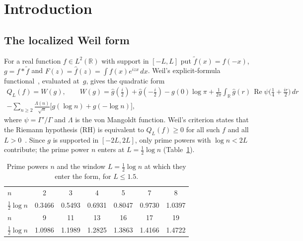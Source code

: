 \documentclass[11pt]{amsart}
\newcommand{\R}{\mathbb{R}}
\newcommand{\re}{\operatorname{Re}}
\theoremstyle{definition}
\theoremstyle{remark}
\numberwithin{equation}{section}
\begin{document}
\section{Introduction}\label{sec:intro}

\subsection{The localized Weil form}
For a real function $f\in L^2(\R)$ with support in $[-L,L]$ put $\tilde f(x)=f(-x)$, $g=f*\tilde f$ and $F(z)=\hat f(z)=\int f(x)e^{izx}\,dx$. Weil's explicit-formula functional~\cite{Weil}, evaluated at~$g$, gives the quadratic form
\begin{multline}\label{eq:weil}
Q_L(f)=W(g),\qquad
W(g)=\hat g(\tfrac i2)+\hat g(-\tfrac i2)-g(0)\log\pi+\frac1{2\pi}\int_\R\hat g(r)\,\re\psi\bigl(\tfrac14+\tfrac{ir}{2}\bigr)\,dr\\
-\sum_{n\ge2}\frac{\Lambda(n)}{\sqrt n}\bigl[g(\log n)+g(-\log n)\bigr],
\end{multline}
where $\psi=\Gamma'/\Gamma$ and $\Lambda$ is the von Mangoldt function. Weil's criterion states that the Riemann hypothesis (RH) is equivalent to $Q_L(f)\ge0$ for all such $f$ and all $L>0$~\cite{Weil,Bombieri}. Since $g$ is supported in $[-2L,2L]$, only prime powers with $\log n<2L$ contribute; the prime power $n$ enters at $L=\tfrac12\log n$ (Table~\ref{tab:primes}).

\begin{table}[ht]
\centering\small
\caption{Prime powers $n$ and the window $L=\tfrac12\log n$ at which they enter the form, for $L\le1.5$.}\label{tab:primes}
\begin{tabular}{l*{6}{c}}
\toprule
$n$ & 2 & 3 & 4 & 5 & 7 & 8\\
$\tfrac12\log n$ & 0.3466 & 0.5493 & 0.6931 & 0.8047 & 0.9730 & 1.0397\\
\midrule
$n$ & 9 & 11 & 13 & 16 & 17 & 19\\
$\tfrac12\log n$ & 1.0986 & 1.1989 & 1.2825 & 1.3863 & 1.4166 & 1.4722\\
\bottomrule
\end{tabular}
\end{table}
\end{document}
